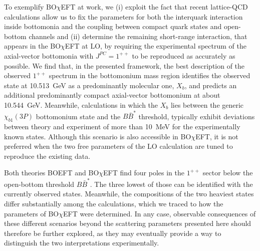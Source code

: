 \documentclass[aps,prd,showpacs,amsmath,twocolumn,superscriptaddress,floatfix,nofootinbib,notitlepage]{revtex4-2}
\newcommand{\Xb}{X_b}
\newcommand{\BOchiEFT}{BO$\chi$EFT\xspace}
\begin{document}
To exemplify \BOchiEFT at work, we (i) exploit the fact that recent lattice-QCD calculations allow us to fix 
the parameters for both the interquark interaction inside bottomonia and the coupling between compact quark states and open-bottom channels and (ii) determine the remaining short-range interaction, that appears in the \BOchiEFT at LO, by requiring the experimental spectrum of the axial-vector bottomonia with $J^{PC}=1^{++}$ to be reproduced as accurately as possible. We find that, in the presented framework, the best description of the observed $1^{++}$ spectrum in the bottomonium mass region identifies the observed state at 10.513~GeV as a predominantly molecular one, $\Xb$, and predicts an additional predominantly compact axial-vector bottomonium at about 10.544~GeV.
Meanwhile, calculations in which the $\Xb$ lies between the generic $\chi_{b1}(3P)$ bottomonium state and the $B\bar{B}^*$ threshold, typically exhibit deviations between theory and experiment of more than 10~MeV for the experimentally known states. 
Although this scenario is also accessible in \BOchiEFT, it is not preferred when the two free parameters of the LO calculation are tuned to reproduce the existing data.

Both theories BOEFT and \BOchiEFT find four poles
in the $1^{++}$ sector 
below the open-bottom threshold $B\bar{B}^*$. The three lowest of those can be identified with the currently observed states. Meanwhile, the compositions of the two heaviest states differ substantially among the calculations, which we traced to how the parameters of \BOchiEFT were determined.
In any case, observable consequences of these different scenarios beyond the scattering parameters presented here should therefore be further explored, as they may eventually provide a way to distinguish the two interpretations experimentally.
\end{document}
